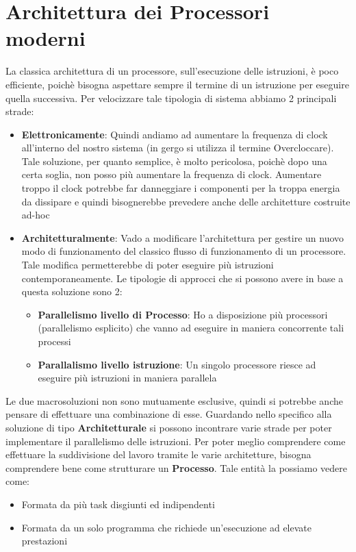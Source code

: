 \newpage
\section{Architettura dei Processori moderni}
La classica architettura di un processore, sull'esecuzione delle istruzioni, è poco efficiente, poichè bisogna aspettare sempre il termine di un istruzione per eseguire quella successiva.
Per velocizzare tale tipologia di sistema abbiamo 2 principali strade:
\begin{itemize}
    \item \textbf{Elettronicamente}: Quindi andiamo ad aumentare la frequenza di clock all'interno del nostro sistema (in gergo si utilizza il termine Overcloccare). Tale soluzione, per quanto semplice, è molto pericolosa, poichè dopo una certa soglia, non posso più aumentare la frequenza di clock. Aumentare troppo il clock potrebbe far danneggiare i componenti per la troppa energia da dissipare e quindi bisognerebbe prevedere anche delle architetture costruite ad-hoc
    
    \item \textbf{Architetturalmente}: Vado a modificare l'architettura per gestire un nuovo modo di funzionamento del classico flusso di funzionamento di un processore. Tale modifica permetterebbe di poter eseguire più istruzioni contemporaneamente. Le tipologie di approcci che si possono avere in base a questa soluzione sono 2:
    \begin{itemize}
        \item \textbf{Parallelismo livello di Processo}: Ho a disposizione più processori (parallelismo esplicito) che vanno ad eseguire in maniera concorrente tali processi
        \item \textbf{Parallalismo livello istruzione}: Un singolo processore riesce ad eseguire più istruzioni in maniera parallela
    \end{itemize}
\end{itemize}

Le due macrosoluzioni non sono mutuamente esclusive, quindi si potrebbe anche pensare di effettuare una combinazione di esse.
Guardando nello specifico alla soluzione di tipo \textbf{Architetturale} si possono incontrare varie strade per poter implementare il parallelismo delle istruzioni.
Per poter meglio comprendere come effettuare la suddivisione del lavoro tramite le varie architetture, bisogna comprendere bene come strutturare un \textbf{Processo}. Tale entità la possiamo vedere come:
\begin{itemize}
    \item Formata da più task disgiunti ed indipendenti
    \item Formata da un solo programma che richiede un'esecuzione ad elevate prestazioni
\end{itemize}

